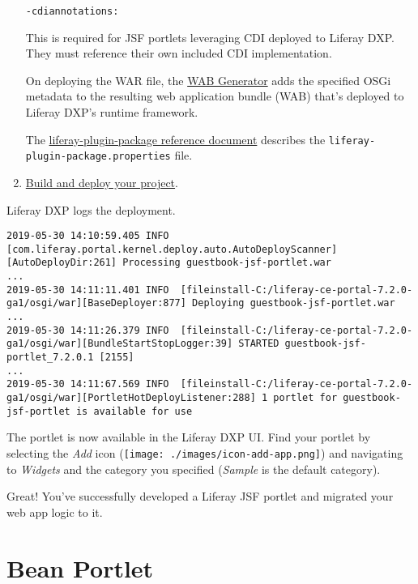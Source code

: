 \begin{enumerate}
\begin{verbatim}
-cdiannotations:
\end{verbatim}

  This is required for JSF portlets leveraging CDI deployed to Liferay
  DXP. They must reference their own included CDI implementation.

  On deploying the WAR file, the
  \href{/docs/7-2/customization/-/knowledge_base/c/deploying-wars-wab-generator}{WAB
  Generator} adds the specified OSGi metadata to the resulting web
  application bundle (WAB) that's deployed to Liferay DXP's runtime
  framework.

  The
  \href{https://docs.liferay.com/dxp/portal/7.2-latest/propertiesdoc/liferay-plugin-package_7_2_0.properties.html}{liferay-plugin-package
  reference document} describes the
  \texttt{liferay-plugin-package.properties} file.
\item
  \href{/docs/7-2/reference/-/knowledge_base/r/deploying-a-project}{Build
  and deploy your project}.
\end{enumerate}

Liferay DXP logs the deployment.

\begin{verbatim}
2019-05-30 14:10:59.405 INFO  [com.liferay.portal.kernel.deploy.auto.AutoDeployScanner][AutoDeployDir:261] Processing guestbook-jsf-portlet.war
...
2019-05-30 14:11:11.401 INFO  [fileinstall-C:/liferay-ce-portal-7.2.0-ga1/osgi/war][BaseDeployer:877] Deploying guestbook-jsf-portlet.war
...
2019-05-30 14:11:26.379 INFO  [fileinstall-C:/liferay-ce-portal-7.2.0-ga1/osgi/war][BundleStartStopLogger:39] STARTED guestbook-jsf-portlet_7.2.0.1 [2155]
...
2019-05-30 14:11:67.569 INFO  [fileinstall-C:/liferay-ce-portal-7.2.0-ga1/osgi/war][PortletHotDeployListener:288] 1 portlet for guestbook-jsf-portlet is available for use
\end{verbatim}

The portlet is now available in the Liferay DXP UI. Find your portlet by
selecting the \emph{Add} icon
(\texttt{[image: ./images/icon-add-app.png]}) and navigating to
\emph{Widgets} and the category you specified (\emph{Sample} is the
default category).

Great! You've successfully developed a Liferay JSF portlet and migrated
your web app logic to it.

\chapter{Bean Portlet}\label{bean-portlet}

